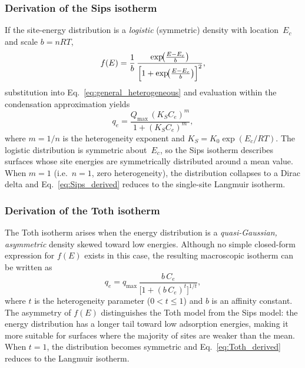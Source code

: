 	\subsubsection{Derivation of the Sips isotherm}

	If the site-energy distribution is a \emph{logistic} (symmetric)
	density with location~$E_c$ and scale $b = nRT$,
	\begin{equation}
		f(E) = \frac{1}{b}\,
		\frac{\exp\!\bigl(\frac{E - E_c}{b}\bigr)}
		{\Bigl[1 + \exp\!\bigl(\frac{E - E_c}{b}\bigr)\Bigr]^{2}},
		\label{eq:sips_energy_dist}
	\end{equation}
	substitution into Eq.~\eqref{eq:general_heterogeneous} and evaluation
	within the condensation approximation yields
	\begin{equation}
		q_e = \frac{Q_{\max}\,(K_S C_e)^{m}}{1 + (K_S C_e)^{m}},
		\label{eq:Sips_derived}
	\end{equation}
	where $m = 1/n$ is the heterogeneity exponent and
	$K_S = K_0\exp(E_c / RT)$.
	The logistic distribution is symmetric about~$E_c$, so the Sips
	isotherm describes surfaces whose site energies are symmetrically
	distributed around a mean value.
	When $m = 1$ (i.e.\ $n = 1$, zero heterogeneity), the distribution
	collapses to a Dirac delta and Eq.~\eqref{eq:Sips_derived} reduces
	to the single-site Langmuir isotherm.

	\subsubsection{Derivation of the Toth isotherm}

	The Toth isotherm arises when the energy distribution is a
	\emph{quasi-Gaussian, asymmetric} density skewed toward low
	energies. Although no simple closed-form expression for $f(E)$
	exists in this case, the resulting macroscopic isotherm can be
	written as
	\begin{equation}
		q_e = q_{\max}\,
		\frac{b\,C_e}{\bigl[1 + (b\,C_e)^{t}\bigr]^{1/t}},
		\label{eq:Toth_derived}
	\end{equation}
	where $t$ is the heterogeneity parameter ($0 < t \leq 1$) and
	$b$ is an affinity constant. The asymmetry of $f(E)$ distinguishes
	the Toth model from the Sips model: the energy distribution has a
	longer tail toward low adsorption energies, making it more suitable
	for surfaces where the majority of sites are weaker than the mean.
	When $t = 1$, the distribution becomes symmetric and
	Eq.~\eqref{eq:Toth_derived} reduces to the Langmuir isotherm.

